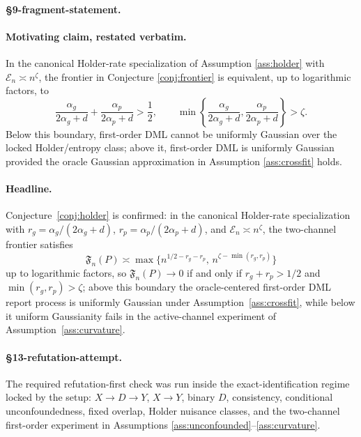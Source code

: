 \paragraph{\S9-fragment-statement.}
\begin{theorem}\label{thm:holder-frontier}
\paragraph{Motivating claim, restated verbatim.}
In the canonical Holder-rate specialization of Assumption \ref{ass:holder} with
\(\mathcal{E}_n\asymp n^\zeta\), the frontier in Conjecture
\ref{conj:frontier} is equivalent, up to logarithmic factors, to
\[
\frac{\alpha_g}{2\alpha_g+d}+\frac{\alpha_p}{2\alpha_p+d}
>\frac12,\qquad
\min\left\{\frac{\alpha_g}{2\alpha_g+d},\frac{\alpha_p}{2\alpha_p+d}\right\}
>\zeta.
\]
Below this boundary, first-order DML cannot be uniformly Gaussian over the
locked Holder/entropy class; above it, first-order DML is uniformly Gaussian
provided the oracle Gaussian approximation in Assumption \ref{ass:crossfit}
holds.

\paragraph{Headline.}
Conjecture~\ref{conj:holder} is confirmed: in the canonical Holder-rate specialization with \(r_g=\alpha_g/(2\alpha_g+d)\), \(r_p=\alpha_p/(2\alpha_p+d)\), and \(\mathcal{E}_n\asymp n^\zeta\), the two-channel frontier satisfies
\[
\mathfrak F_n(P)\asymp
\max\{n^{1/2-r_g-r_p},\,n^{\zeta-\min(r_g,r_p)}\}
\]
up to logarithmic factors, so \(\mathfrak F_n(P)\to0\) if and only if \(r_g+r_p>1/2\) and \(\min(r_g,r_p)>\zeta\); above this boundary the oracle-centered first-order DML report process is uniformly Gaussian under Assumption~\ref{ass:crossfit}, while below it uniform Gaussianity fails in the active-channel experiment of Assumption~\ref{ass:curvature}.
\end{theorem}

\paragraph{\S13-refutation-attempt.}
The required refutation-first check was run inside the exact-identification
regime locked by the setup: \(X\to D\to Y\), \(X\to Y\), binary \(D\),
consistency, conditional unconfoundedness, fixed overlap, Holder nuisance
classes, and the two-channel first-order experiment in Assumptions
\ref{ass:unconfounded}--\ref{ass:curvature}.

